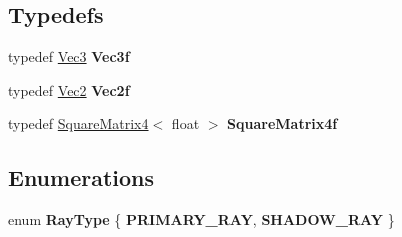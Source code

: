 \subsection*{Typedefs}
\begin{DoxyCompactItemize}
\item 
typedef \hyperlink{class_vec3}{Vec3} {\bfseries Vec3f}\hypertarget{group__linear__algebra_ga826e11f7e1e44c9038dc9cc7747b5067}{}\label{group__linear__algebra_ga826e11f7e1e44c9038dc9cc7747b5067}

\item 
typedef \hyperlink{class_vec2}{Vec2} {\bfseries Vec2f}\hypertarget{group__linear__algebra_gabe2f61ad7a1f5cdfd77e55822d77ec77}{}\label{group__linear__algebra_gabe2f61ad7a1f5cdfd77e55822d77ec77}

\item 
typedef \hyperlink{class_square_matrix4}{Square\+Matrix4}$<$ float $>$ {\bfseries Square\+Matrix4f}\hypertarget{group__linear__algebra_gad2b85d4d9fb5b5e4deaf20bff9595185}{}\label{group__linear__algebra_gad2b85d4d9fb5b5e4deaf20bff9595185}

\end{DoxyCompactItemize}
\subsection*{Enumerations}
\begin{DoxyCompactItemize}
\item 
enum {\bfseries Ray\+Type} \{ {\bfseries P\+R\+I\+M\+A\+R\+Y\+\_\+\+R\+AY}, 
{\bfseries S\+H\+A\+D\+O\+W\+\_\+\+R\+AY}
 \}\hypertarget{group__linear__algebra_ga1d5111b9fffd76014406e866c8784459}{}\label{group__linear__algebra_ga1d5111b9fffd76014406e866c8784459}

\end{DoxyCompactItemize}
